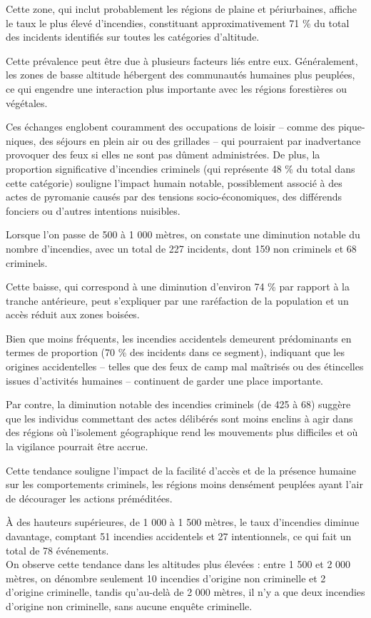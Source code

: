 \documentclass[
]{article}
\begin{document}
Cette zone, qui inclut probablement les régions de plaine et
périurbaines, affiche le taux le plus élevé d'incendies, constituant
approximativement 71 \% du total des incidents identifiés sur toutes les
catégories d'altitude.

Cette prévalence peut être due à plusieurs facteurs liés entre eux.
Généralement, les zones de basse altitude hébergent des communautés
humaines plus peuplées, ce qui engendre une interaction plus importante
avec les régions forestières ou végétales.

Ces échanges englobent couramment des occupations de loisir -- comme des
pique-niques, des séjours en plein air ou des grillades -- qui
pourraient par inadvertance provoquer des feux si elles ne sont pas
dûment administrées. De plus, la proportion significative d'incendies
criminels (qui représente 48 \% du total dans cette catégorie) souligne
l'impact humain notable, possiblement associé à des actes de pyromanie
causés par des tensions socio-économiques, des différends fonciers ou
d'autres intentions nuisibles.

Lorsque l'on passe de 500 à 1 000 mètres, on constate une diminution
notable du nombre d'incendies, avec un total de 227 incidents, dont 159
non criminels et 68 criminels.

Cette baisse, qui correspond à une diminution d'environ 74 \% par
rapport à la tranche antérieure, peut s'expliquer par une raréfaction de
la population et un accès réduit aux zones boisées.

Bien que moins fréquents, les incendies accidentels demeurent
prédominants en termes de proportion (70 \% des incidents dans ce
segment), indiquant que les origines accidentelles -- telles que des
feux de camp mal maîtrisés ou des étincelles issues d'activités humaines
-- continuent de garder une place importante.

Par contre, la diminution notable des incendies criminels (de 425 à 68)
suggère que les individus commettant des actes délibérés sont moins
enclins à agir dans des régions où l'isolement géographique rend les
mouvements plus difficiles et où la vigilance pourrait être accrue.

Cette tendance souligne l'impact de la facilité d'accès et de la
présence humaine sur les comportements criminels, les régions moins
densément peuplées ayant l'air de décourager les actions préméditées.

À des hauteurs supérieures, de 1 000 à 1 500 mètres, le taux d'incendies
diminue davantage, comptant 51 incendies accidentels et 27
intentionnels, ce qui fait un total de 78 événements.\\
On observe cette tendance dans les altitudes plus élevées : entre 1 500
et 2 000 mètres, on dénombre seulement 10 incendies d'origine non
criminelle et 2 d'origine criminelle, tandis qu'au-delà de 2 000 mètres,
il n'y a que deux incendies d'origine non criminelle, sans aucune
enquête criminelle.
\end{document}
